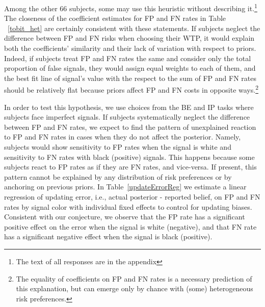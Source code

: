 \documentclass[12pt,a4paper]{article}
\begin{document}
Among the other 66 subjects, some may use this heuristic without describing it.\footnote{The text of all responses are in the appendix}  The closeness of the coefficient estimates for FP and FN rates in Table ~\ref{tobit_het} are certainly consistent with these statements. If subjects neglect the difference between FP and FN risks when choosing their WTP, it would explain both the coefficients' similarity and their lack of variation with respect to priors. Indeed, if subjects treat FP and FN rates the same and consider only the total proportion of false signals, they would assign equal weights to each of them, and the best fit line of signal's value with the respect to the sum of FP and FN rates should be relatively flat because priors affect FP and FN costs in opposite ways.\footnote{The equality of coefficients on FP and FN rates is a necessary prediction of this explanation, but can emerge only by chance with (some) heterogeneous risk preferences.}

In order to test this hypothesis, we use choices from the BE and IP tasks where subjects face imperfect signals. If subjects systematically neglect the difference between FP and FN rates, we expect to find the pattern of unexplained reaction to FP and FN rates in cases when they do not affect the posterior. Namely, subjects would show sensitivity to FP rates when the signal is white and sensitivity to FN rates with black (positive) signals. This happens because some subjects react to FP rates as if they are FN rates, and vice-versa. If present, this pattern cannot be explained by any distribution of risk preferences or by anchoring on previous priors.  In Table~\ref{updateErrorReg} we estimate a linear regression of updating error, i.e., actual posterior - reported belief, on FP and FN rates by signal color with individual fixed effects to control for updating biases. Consistent with our conjecture, we observe that the FP rate has a significant positive effect on the error when the signal is white (negative), and that FN rate has a significant negative effect when the signal is black (positive). 


\end{document}
